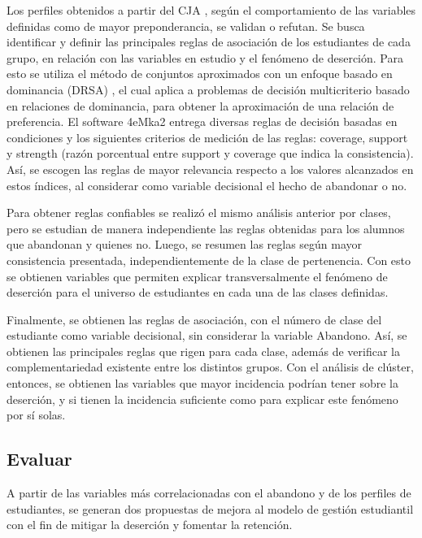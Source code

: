 \documentclass[portuguese]{textolivre}
\begin{document}
Los perfiles obtenidos a partir del CJA \cite{Buritica2019}, según el comportamiento de las variables definidas como de mayor preponderancia, se validan o refutan. Se busca identificar y definir las principales reglas de asociación de los estudiantes de cada grupo, en relación con las variables en estudio y el fenómeno de deserción. Para esto se utiliza el método de conjuntos aproximados con un enfoque basado en dominancia (DRSA) \cite{Bouzayane2017,Greco1999,Greco2002a}, el cual aplica a problemas de decisión multicriterio basado en relaciones de dominancia, para obtener la aproximación de una relación de preferencia. El software 4eMka2 \cite{Greco1999,LaboratoryofIntelligentDecisionSupportSystemsIDSS} entrega diversas reglas de decisión basadas en condiciones y los siguientes criterios de medición de las reglas: coverage, support y strength (razón porcentual entre support y coverage que indica la consistencia). Así, se escogen las reglas de mayor relevancia respecto a los valores alcanzados en estos índices, al considerar como variable decisional el hecho de abandonar o no.

Para obtener reglas confiables se realizó el mismo análisis anterior por clases, pero se estudian de manera independiente las reglas obtenidas para los alumnos que abandonan y quienes no. Luego, se resumen las reglas según mayor consistencia presentada, independientemente de la clase de pertenencia. Con esto se obtienen variables que permiten explicar transversalmente el fenómeno de deserción para el universo de estudiantes en cada una de las clases definidas.

Finalmente, se obtienen las reglas de asociación, con el número de clase del estudiante como variable decisional, sin considerar la variable Abandono. Así, se obtienen las principales reglas que rigen para cada clase, además de verificar la complementariedad existente entre los distintos grupos. Con el análisis de clúster, entonces, se obtienen las variables que mayor incidencia podrían tener sobre la deserción, y si tienen la incidencia suficiente como para explicar este fenómeno por sí solas.

\subsection{Evaluar}

A partir de las variables más correlacionadas con el abandono y de los perfiles de estudiantes, se generan dos propuestas de mejora al modelo de gestión estudiantil con el fin de mitigar la deserción y fomentar la retención.
\end{document}
